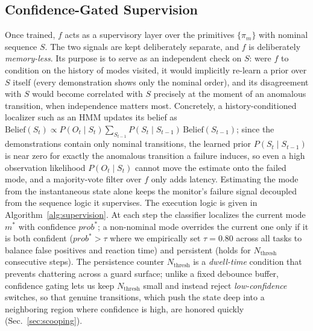 \subsection{Confidence-Gated Supervision}
\label{sec:supervision}
Once trained, $f$ acts as a supervisory layer over the primitives $\{\pi_m\}$ with nominal sequence $S$. The two signals are kept deliberately separate, and $f$ is deliberately \emph{memory-less}. Its purpose is to serve as an independent check on $S$: were $f$ to condition on the history of modes visited, it would implicitly re-learn a prior over $S$ itself (every demonstration shows only the nominal order), and its disagreement with $S$ would become correlated with $S$ precisely at the moment of an anomalous transition, when independence matters most. Concretely, a history-conditioned localizer such as an HMM updates its belief as $\mathrm{Belief}(S_t)\propto P(O_t\mid S_t)\sum_{S_{t-1}} P(S_t\mid S_{t-1})\,\mathrm{Belief}(S_{t-1})$; since the demonstrations contain only nominal transitions, the learned prior $P(S_t\mid S_{t-1})$ is near zero for exactly the anomalous transition a failure induces, so even a high observation likelihood $P(O_t\mid S_t)$ cannot move the estimate onto the failed mode, and a majority-vote filter over $f$ only adds latency. Estimating the mode from the instantaneous state alone keeps the monitor's failure signal decoupled from the sequence logic it supervises. The execution logic is given in Algorithm~\ref{alg:supervision}. At each step the classifier localizes the current mode $m^*$ with confidence $prob^*$; a non-nominal mode overrides the current one only if it is both confident ($prob^*>\tau$ where we empirically set $\tau = 0.80$ across all tasks to balance false positives and reaction time) and persistent (holds for $N_{\text{thresh}}$ consecutive steps). The persistence counter $N_{\text{thresh}}$ is a \emph{dwell-time} condition that prevents chattering across a guard surface; unlike a fixed debounce buffer, confidence gating lets us keep $N_{\text{thresh}}$ small and instead reject \emph{low-confidence} switches, so that genuine transitions, which push the state deep into a neighboring region where confidence is high, are honored quickly (Sec.~\ref{sec:scooping}).

